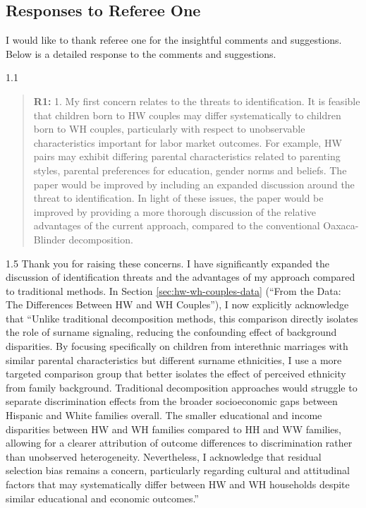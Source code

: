 \documentclass[12pt,english]{article}
\newcommand{\rrquote}{1.1}
\newcommand{\rrxspc}{1.5}
\begin{document}
\begin{refsection}
\section{Responses to Referee One}
I would like to thank referee one for the insightful comments and suggestions. Below is a detailed response to the comments and suggestions.
\begin{spacing}{\rrquote}
\begin{quotation}
\textbf{R1: } 1. My first concern relates to the threats to identification. It is feasible that children born to HW couples may differ systematically to children born to WH couples, particularly with respect to unobservable characteristics important for labor market outcomes. For example, HW pairs may exhibit differing parental characteristics related to parenting styles, parental preferences for education, gender norms and beliefs. The paper would be improved by including an expanded discussion around the threat to identification. In light of these issues, the paper would be improved by providing a more thorough discussion of the relative advantages of the current approach, compared to the conventional Oaxaca-Blinder decomposition.
\end{quotation}
\end{spacing}
\begin{spacing}{\rrxspc}
    Thank you for raising these concerns. I have significantly expanded the discussion of identification threats and the advantages of my approach compared to traditional methods. In Section \ref{sec:hw-wh-couples-data} (``From the Data: The Differences Between HW and WH Couples''), I now explicitly acknowledge that ``Unlike traditional decomposition methods, this comparison directly isolates the role of surname signaling, reducing the confounding effect of background disparities. By focusing specifically on children from interethnic marriages with similar parental characteristics but different surname ethnicities, I use a more targeted comparison group that better isolates the effect of perceived ethnicity from family background. Traditional decomposition approaches would struggle to separate discrimination effects from the broader socioeconomic gaps between Hispanic and White families overall. The smaller educational and income disparities between HW and WH families compared to HH and WW families, allowing for a clearer attribution of outcome differences to discrimination rather than unobserved heterogeneity. Nevertheless, I acknowledge that residual selection bias remains a concern, particularly regarding cultural and attitudinal factors that may systematically differ between HW and WH households despite similar educational and economic outcomes.''
\end{spacing}


\end{refsection}
\end{document}

